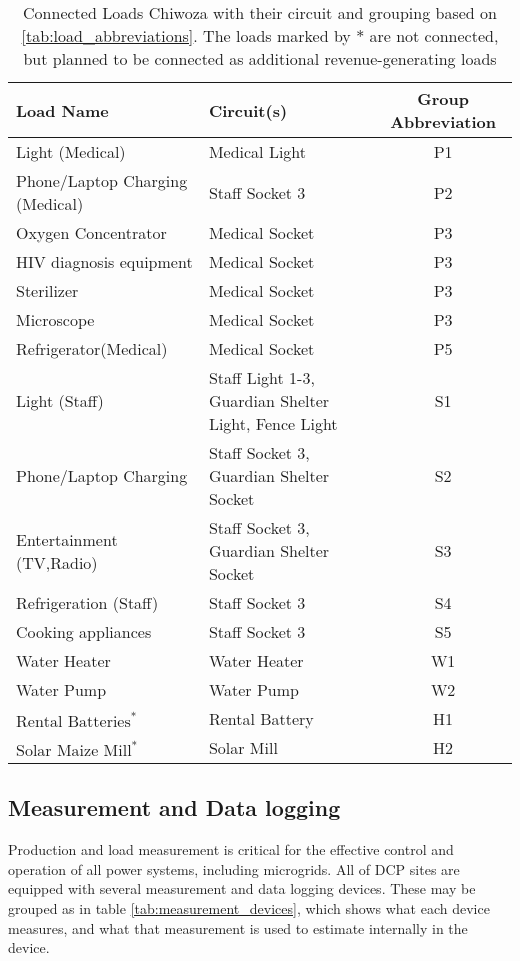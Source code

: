 \begin{table}[ht]
    \centering
    \small %
    \begin{tabularx}{\textwidth}{|X|X|c|}
         \textbf{Load Name} & \textbf{Circuit(s)} & \textbf{Group Abbreviation}\\
         \hline
         Light (Medical) & Medical Light & P1\\
         \hline
         Phone/Laptop Charging (Medical)   &  Staff Socket 3 & P2\\
         \hline
         Oxygen Concentrator & Medical Socket & P3\\
         \hline
         HIV diagnosis equipment & Medical Socket & P3\\
         \hline
         Sterilizer & Medical Socket & P3\\
         \hline
         Microscope & Medical Socket & P3\\
         \hline
         Refrigerator(Medical) & Medical Socket & P5\\
         \hline
         Light (Staff) & Staff Light 1-3, Guardian Shelter Light, Fence Light & S1\\
         \hline
         Phone/Laptop Charging  &  Staff Socket 3, Guardian Shelter Socket  & S2\\
         \hline
         Entertainment (TV,Radio) & Staff Socket 3, Guardian Shelter Socket & S3\\         
         \hline
         Refrigeration (Staff) & Staff Socket 3 & S4\\
         \hline
         Cooking appliances & Staff Socket 3 & S5\\
         \hline
         Water Heater & Water Heater & W1\\
         \hline
         Water Pump & Water Pump & W2\\
         \hline
         $\text{Rental Batteries}^*$ & Rental Battery & H1\\
         \hline
         $\text{Solar Maize Mill}^*$ & Solar Mill & H2
    \end{tabularx}
    \caption[Loads at Chiwoza]{Connected Loads Chiwoza with their circuit and grouping based on \autoref{tab:load_abbreviations}. The loads marked by $*$ are not connected, but planned to be connected as additional revenue-generating loads}
    \label{tab:loads_chiwoza}
\end{table}

\subsection{Measurement and Data logging}\label{seq:data_collection}
Production and load measurement is critical for the effective control and operation of all power systems, including microgrids. All of DCP sites are equipped with several measurement and data logging devices. These may be grouped as in table \ref{tab:measurement_devices}, which shows what each device measures, and what that measurement is used to estimate internally in the device.\\

